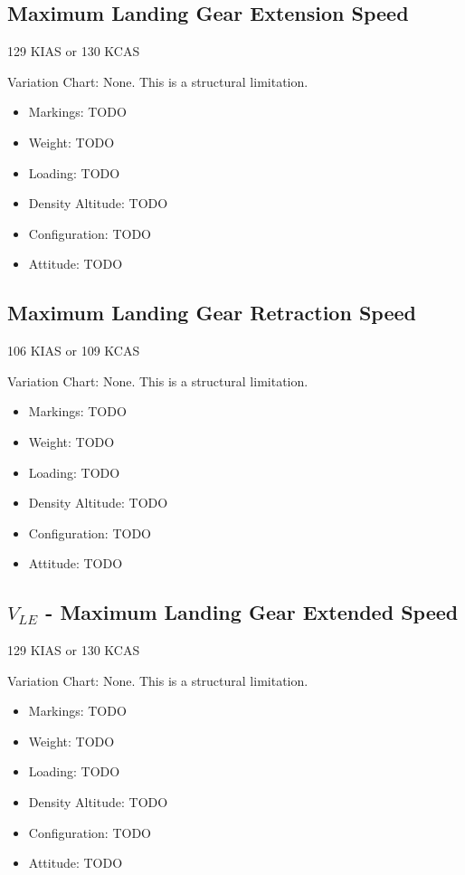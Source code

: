 \subsection{Maximum Landing Gear Extension Speed}

129 KIAS or 130 KCAS

Variation Chart: None. This is a structural limitation.

\begin{itemize}
\item Markings: TODO
\item Weight: TODO
\item Loading: TODO
\item Density Altitude: TODO
\item Configuration: TODO
\item Attitude: TODO
\end{itemize}

\subsection{Maximum Landing Gear Retraction Speed}

106 KIAS or 109 KCAS

Variation Chart: None. This is a structural limitation.

\begin{itemize}
\item Markings: TODO
\item Weight: TODO
\item Loading: TODO
\item Density Altitude: TODO
\item Configuration: TODO
\item Attitude: TODO
\end{itemize}

\subsection{$V_{LE}$ - Maximum Landing Gear Extended Speed}

129 KIAS or 130 KCAS

Variation Chart: None. This is a structural limitation.

\begin{itemize}
\item Markings: TODO
\item Weight: TODO
\item Loading: TODO
\item Density Altitude: TODO
\item Configuration: TODO
\item Attitude: TODO
\end{itemize}

